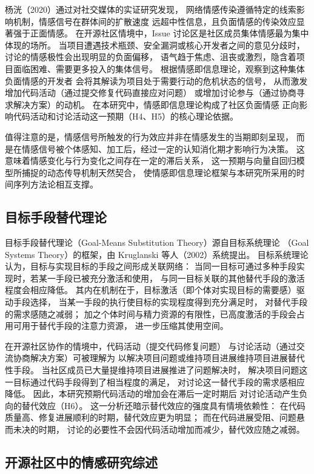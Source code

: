 \documentclass[
    type = master, %
    degree = professional,        %
    decl-page,  %
    twoside,                %
    fontset = fandol %
  ]{njuthesis}
\begin{document}
杨{\notoserifjk 洸}（2020）通过对社交媒体的实证研究发现，
网络情感传染遵循特定的线索影响机制，情感信号在群体间的扩散速度
远超中性信息，且负面情感的传染效应显著强于正面情感\cite{yang2020sentiment}。
在开源社区情境中，Issue 讨论区是社区成员集体情感最为集中体现的场所。
当项目遭遇技术瓶颈、安全漏洞或核心开发者之间的意见分歧时，
讨论的情感极性会出现明显的负面偏移，
语气趋于焦虑、沮丧或激烈，隐含着项目面临困难、需要更多投入的集体信号。
根据情感即信息理论，观察到这种集体负面情感的开发者
会将其解读为项目处于需要行动的危机状态的信号，
从而激发增加代码活动（通过提交修复代码直接应对问题）
或增加讨论参与（通过协商寻求解决方案）的动机。
在本研究中，情感即信息理论构成了社区负面情感
正向影响代码活动和讨论活动这一预期（H4、H5）的核心理论依据。

值得注意的是，情感信号所触发的行为效应并非在情感发生的当期即刻呈现，
而是在情感信号被个体感知、加工后，经过一定的认知消化期才影响行为决策。
这意味着情感变化与行为变化之间存在一定的滞后关系，
这一预期与向量自回归模型所捕捉的动态传导机制天然契合，
使情感即信息理论框架与本研究所采用的时间序列方法论相互支撑。

\subsection{目标手段替代理论}

目标手段替代理论（Goal-Means Substitution Theory）源自目标系统理论
（Goal Systems Theory）的框架，由 Kruglanski 等人（2002）系统提出\cite{kruglanski2002theory}。
目标系统理论认为，目标与实现目标的手段之间形成关联网络：
当同一目标可通过多种手段实现时，若某一手段已被充分激活和使用，
与同一目标关联的其他替代手段的激活程度会相应降低。
其内在机制在于，目标激活（即个体对实现目标的需要感）驱动手段选择，
当某一手段的执行使目标的实现程度得到充分满足时，
对替代手段的需求感随之减弱；
加之个体时间与精力资源的有限性，已高度激活的手段会占用可用于替代手段的注意力资源，
进一步压缩其使用空间。

在开源社区协作的情境中，代码活动（提交代码修复问题）
与讨论活动（通过交流协商解决方案）可被理解为
以解决项目问题或维持项目进展维持项目进展替代性手段。
当社区成员已大量提维持项目进展推进了问题解决时，
解决项目问题这一目标通过代码手段得到了相当程度的满足，
对讨论这一替代手段的需求感相应降低。
因此，本研究预期代码活动的增加会在滞后一定时期后
对讨论活动产生负向的替代效应（H6）。
这一分析还暗示替代效应的强度具有情境依赖性：
在代码质量高、修复进展顺利的时期，替代效应更为明显；
而在代码进展受阻、问题悬而未决的时期，
讨论的必要性不会因代码活动增加而减少，替代效应随之减弱。

\subsection{开源社区中的情感研究综述}
\end{document}
